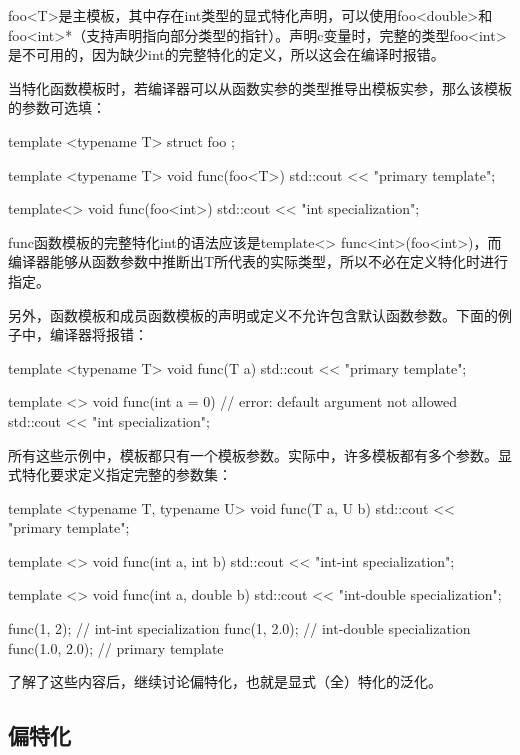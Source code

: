 foo<T>是主模板，其中存在int类型的显式特化声明，可以使用foo<double>和foo<int>*（支持声明指向部分类型的指针）。声明c变量时，完整的类型foo<int>是不可用的，因为缺少int的完整特化的定义，所以这会在编译时报错。

当特化函数模板时，若编译器可以从函数实参的类型推导出模板实参，那么该模板的参数可选填：

\begin{cpp}
template <typename T>
struct foo {};

template <typename T>
void func(foo<T>)
{
	std::cout << "primary template\n";
}

template<>
void func(foo<int>)
{
	std::cout << "int specialization\n";
}
\end{cpp}

func函数模板的完整特化int的语法应该是template<> func<int>(foo<int>)，而编译器能够从函数参数中推断出T所代表的实际类型，所以不必在定义特化时进行指定。

另外，函数模板和成员函数模板的声明或定义不允许包含默认函数参数。下面的例子中，编译器将报错：

\begin{cpp}
template <typename T>
void func(T a)
{
	std::cout << "primary template\n";
}

template <>
void func(int a = 0) // error: default argument not allowed
{
	std::cout << "int specialization\n";
}
\end{cpp}

所有这些示例中，模板都只有一个模板参数。实际中，许多模板都有多个参数。显式特化要求定义指定完整的参数集：

\begin{cpp}
template <typename T, typename U>
void func(T a, U b)
{
	std::cout << "primary template\n";
}

template <>
void func(int a, int b)
{
std::cout << "int-int specialization\n";
}

template <>
void func(int a, double b)
{
std::cout << "int-double specialization\n";
}

func(1, 2); // int-int specialization
func(1, 2.0); // int-double specialization
func(1.0, 2.0); // primary template
\end{cpp}

了解了这些内容后，继续讨论偏特化，也就是显式（全）特化的泛化。

\subsection{偏特化}

